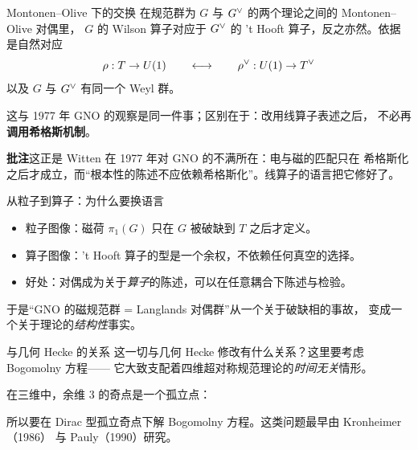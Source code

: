 \begin{frame}{Montonen--Olive 下的交换}
   在规范群为 $G$ 与 $G^{\vee}$ 的两个理论之间的 Montonen--Olive 对偶里，
  $G$ 的 Wilson 算子对应于 $G^{\vee}$ 的 't Hooft 算子，反之亦然。依据是自然对应
  \[
    \rho:T\to U(1)
    \qquad\longleftrightarrow\qquad
    \rho^{\vee}:U(1)\to T^{\vee}
  \]
  以及 $G$ 与 $G^{\vee}$ 有同一个 Weyl 群。
  \vspace{0.4em}

  这与 1977 年 GNO 的观察是同一件事；区别在于：改用线算子表述之后，
  不必再\textbf{调用希格斯机制}。
  \begin{beizhu}
  \textbf{批注}\quad 这正是 Witten 在 1977 年对 GNO 的不满所在：电与磁的匹配只在
  希格斯化之后才成立，而“根本性的陈述不应依赖希格斯化”。线算子的语言把它修好了。
  \end{beizhu}
\end{frame}

\begin{frame}{从粒子到算子：为什么要换语言}
  \begin{itemize}
    \item 粒子图像：磁荷 $\pi_1(G)$ 只在 $G$ 被破缺到 $T$ 之后才定义。
    \item 算子图像：'t Hooft 算子的型是一个余权，不依赖任何真空的选择。
    \item 好处：对偶成为关于\emph{算子}的陈述，可以在任意耦合下陈述与检验。
  \end{itemize}
  \vspace{0.5em}
  于是“GNO 的磁规范群 = Langlands 对偶群”从一个关于破缺相的事故，
  变成一个关于理论的\emph{结构性}事实。
\end{frame}


\begin{frame}{与几何 Hecke 的关系}
   这一切与几何 Hecke 修改有什么关系？这里要考虑 Bogomolny 方程——
  它大致支配着四维超对称规范理论的\emph{时间无关}情形。
  \vspace{0.4em}

  在三维中，余维 $3$ 的奇点是一个孤立点：
  \begin{center}
  \end{center}
  所以要在 Dirac 型孤立奇点下解 Bogomolny 方程。这类问题最早由 Kronheimer（1986）
  与 Pauly（1990）研究。
\end{frame}


